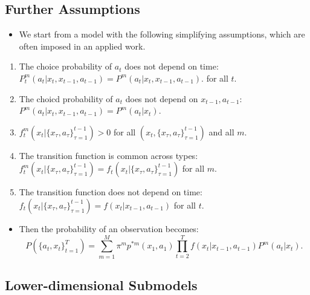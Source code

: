 \documentclass[]{book}
\providecommand{\tightlist}{%
  \setlength{\itemsep}{0pt}\setlength{\parskip}{0pt}}
\begin{document}
\subsection{Further Assumptions}\label{assumptions-finite-mixture}

\begin{itemize}
\tightlist
\item
  We start from a model with the following simplifying assumptions,
  which are often imposed in an applied work.
\end{itemize}

\begin{enumerate}
\def\labelenumi{\arabic{enumi}.}
\tightlist
\item
  The choice probability of \(a_t\) does not depend on time:
  \(P_t^m(a_t|x_t, x_{t - 1}, a_{t - 1}) = P^m(a_t|x_t, x_{t - 1}, a_{t - 1})\).
  for all \(t\).
\item
  The choicd probability of \(a_t\) does not depend on
  \(x_{t - 1}, a_{t - 1}\):
  \(P^m(a_t|x_t, x_{t - 1}, a_{t - 1}) = P^m(a_t|x_t)\).
\item
  \(f_t^{m}(x_t|\{x_\tau, a_\tau\}_{\tau = 1}^{t - 1}) > 0\) for all
  \((x_t, \{x_\tau, a_\tau\}_{\tau = 1}^{t - 1})\) and all \(m\).
\item
  The transition function is common across types:
  \(f_t^m(x_t|\{x_\tau, a_\tau\}_{\tau = 1}^{t - 1}) = f_t(x_t|\{x_\tau, a_\tau\}_{\tau = 1}^{t - 1})\)
  for all \(m\).
\item
  The transition function does not depend on time:
  \(f_t(x_t|\{x_\tau, a_\tau\}_{\tau = 1}^{t - 1}) = f(x_t|x_{t - 1}, a_{t - 1})\)
  for all \(t\).
\end{enumerate}

\begin{itemize}
\tightlist
\item
  Then the probability of an observation becomes: \[
  P(\{a_t, x_t\}_{t = 1}^T) = \sum_{m = 1}^M \pi^m p^{*m}(x_1, a_1) \prod_{t = 2}^T f(x_t|x_{t - 1}, a_{t - 1}) P^m(a_t| x_t).
  \]
\end{itemize}

\subsection{Lower-dimensional
Submodels}\label{lower-dimensional-submodels}
\end{document}

